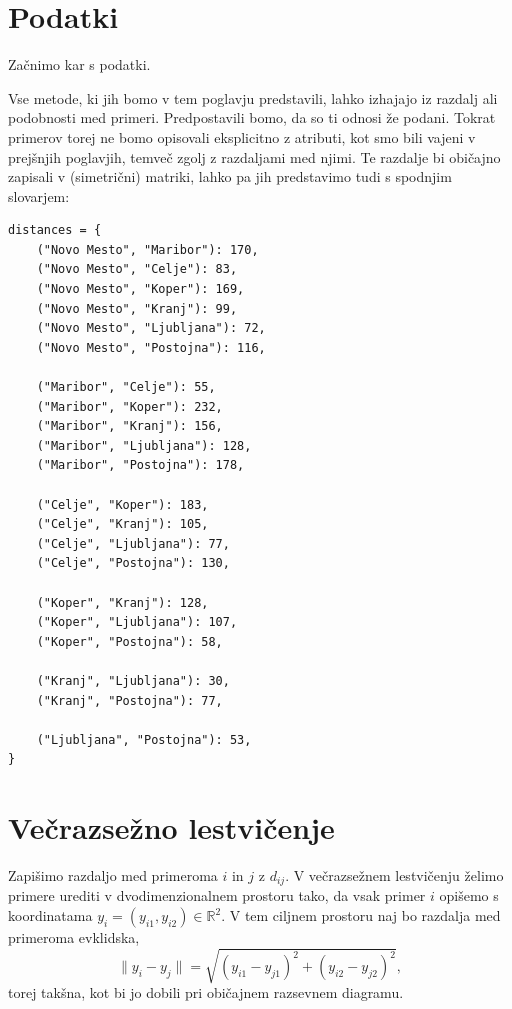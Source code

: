 \section{Podatki}


Začnimo kar s podatki.
%
%

Vse metode, ki jih bomo v tem poglavju predstavili, lahko izhajajo iz razdalj ali podobnosti med primeri. Predpostavili bomo, da so ti odnosi že podani. Tokrat primerov torej ne bomo opisovali eksplicitno z atributi, kot smo bili vajeni v prejšnjih poglavjih, temveč zgolj z razdaljami med njimi. Te razdalje bi običajno zapisali v (simetrični) matriki, lahko pa jih predstavimo tudi s spodnjim slovarjem:

\vspace*{3mm}
\begin{lstlisting}
distances = {
    ("Novo Mesto", "Maribor"): 170,
    ("Novo Mesto", "Celje"): 83,
    ("Novo Mesto", "Koper"): 169,
    ("Novo Mesto", "Kranj"): 99,
    ("Novo Mesto", "Ljubljana"): 72,
    ("Novo Mesto", "Postojna"): 116,

    ("Maribor", "Celje"): 55,
    ("Maribor", "Koper"): 232,
    ("Maribor", "Kranj"): 156,
    ("Maribor", "Ljubljana"): 128,
    ("Maribor", "Postojna"): 178,

    ("Celje", "Koper"): 183,
    ("Celje", "Kranj"): 105,
    ("Celje", "Ljubljana"): 77,
    ("Celje", "Postojna"): 130,

    ("Koper", "Kranj"): 128,
    ("Koper", "Ljubljana"): 107,
    ("Koper", "Postojna"): 58,

    ("Kranj", "Ljubljana"): 30,
    ("Kranj", "Postojna"): 77,

    ("Ljubljana", "Postojna"): 53,
}
\end{lstlisting}

\section{Večrazsežno lestvičenje}

Zapišimo 
%
%
razdaljo med primeroma \( i \) in \( j \) z \( d_{ij} \). V večrazsežnem lestvičenju želimo primere urediti v dvodimenzionalnem prostoru tako, da vsak primer \( i \) opišemo s koordinatama \( y_i = (y_{i1}, y_{i2}) \in \mathbb{R}^2 \). V tem ciljnem prostoru naj bo razdalja med primeroma evklidska,
\[
\|y_i - y_j\| = \sqrt{(y_{i1} - y_{j1})^2 + (y_{i2} - y_{j2})^2},
\]
torej takšna, kot bi jo dobili pri običajnem razsevnem diagramu.

